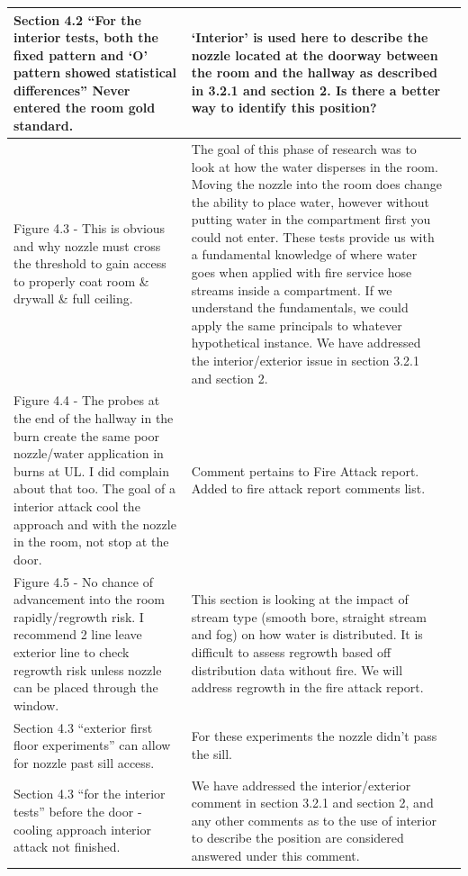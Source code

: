 \documentclass[12pt,oneside]{book}
\begin{document}
\begin{landscape}
\begin{longtable}{|L{4in}|L{3.75in}|c|}
		\hline
		Section 4.2 ``For the interior tests, both the fixed pattern and `O' pattern showed statistical differences'' Never entered the room gold standard. &
		`Interior' is used here to describe the nozzle located at the doorway between the room and the hallway as described in 3.2.1 and section 2. \textbf{Is there a better way to identify this position?} & \\

		\hline
		Figure 4.3 - This is obvious and why nozzle must cross the threshold to gain access to properly coat room \& drywall \& full ceiling. &
		The goal of this phase of research was to look at how the water disperses in the room. Moving the nozzle into the room does change the ability to place water, however without putting water in the compartment first you could not enter. These tests provide us with a fundamental knowledge of where water goes when applied with fire service hose streams inside a compartment. If we understand the fundamentals, we could apply the same principals to whatever hypothetical instance. We have addressed the interior/exterior issue in section 3.2.1 and section 2. & \\

		\hline
		Figure 4.4 - The probes at the end of the hallway in the burn create the same poor nozzle/water application in burns at UL. I did complain about that too. The goal of a interior attack cool the approach and with the nozzle in the room, not stop at the door. & 
		Comment pertains to Fire Attack report. Added to fire attack report comments list. & \\

		\hline 
		Figure 4.5 - No chance of advancement into the room rapidly/regrowth risk. I recommend 2 line leave exterior line to check regrowth risk unless nozzle can be placed through the window. & 
		This section is looking at the impact of stream type (smooth bore, straight stream and fog) on how water is distributed. It is difficult to assess regrowth based off distribution data without fire. We will address regrowth in the fire attack report. & \\ 
		\hline
		Section 4.3 ``exterior first floor experiments'' can allow for nozzle past sill access. & For these experiments the nozzle didn't pass the sill. & \\

		\hline 
		Section 4.3 ``for the interior tests'' before the door - cooling approach interior attack not finished. &
		We have addressed the interior/exterior comment in section 3.2.1 and section 2, and any other comments as to the use of interior to describe the position are considered answered under this comment. & \\


\end{longtable}
\end{landscape}
\end{document}
